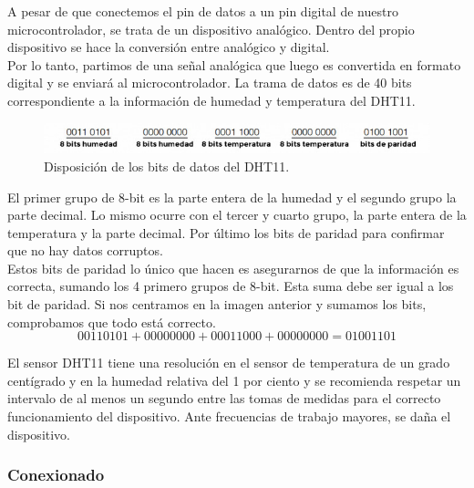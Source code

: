 A pesar de que conectemos el pin de datos a un pin digital de nuestro microcontrolador, se trata de un dispositivo analógico. Dentro del propio dispositivo se hace la
conversión entre analógico y digital.\\

Por lo tanto, partimos de una señal analógica que luego es convertida en formato digital y se enviará al microcontrolador. La trama de datos es de 40 bits correspondiente a la
información de humedad y temperatura del DHT11.\\

\begin{figure}[H]
  \begin{center}
    \includegraphics[scale=0.6]{imagenes/dth11_bits.jpg}
  \end{center}
  \caption{Disposición de los bits de datos del DHT11.}
  \label{figura:sensor_dth11_bits}
\end{figure}

El primer grupo de 8-bit es la parte entera de la humedad y el segundo grupo la parte decimal. Lo mismo ocurre con el tercer y cuarto grupo, la parte entera de la temperatura 
y la parte decimal. Por último los bits de paridad para confirmar que no hay datos corruptos.\\

Estos bits de paridad lo único que hacen es asegurarnos de que la información es correcta, sumando los 4 primero grupos de 8-bit. Esta suma debe ser igual a los bit de
paridad. Si nos centramos en la imagen anterior y sumamos los bits, comprobamos que todo está correcto.\\

\begin{equation}
0011 0101 + 0000 0000 + 0001 1000 + 0000 0000 = 0100 1101
\end{equation}

El sensor DHT11 tiene una resolución en el sensor de temperatura de un grado centígrado y en la
humedad relativa del 1 por ciento y se recomienda respetar un intervalo de al menos un segundo entre las
tomas de medidas para el correcto funcionamiento del dispositivo. Ante frecuencias de trabajo
mayores, se daña el dispositivo.\\

\subsubsection{Conexionado}

